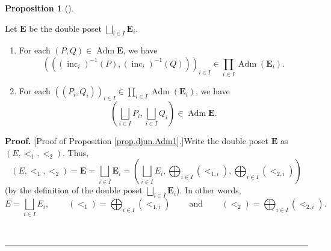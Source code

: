 \documentclass[numbers=enddot,12pt,final,onecolumn,notitlepage,abstracton]{scrartcl}
\theoremstyle{definition}
\newtheorem{prop}[theo]{Proposition}
\newenvironment{proposition}[1][]
{\begin{prop}[#1]\begin{leftbar}}
{\end{leftbar}\end{prop}}
\newenvironment{proof}[1][Proof]{\noindent\textbf{#1.} }{\ \rule{0.5em}{0.5em}}
\let\prodnonlimits\prod
\renewcommand{\prod}{\prodnonlimits\limits}
\newenvironment{verlong}{}{}
\begin{document}
\begin{verlong}
\begin{footnotesize}
\begin{proposition}
Let $\mathbf{E}$ be the double poset $\bigsqcup_{i\in I}\mathbf{E}_{i}$.

\begin{enumerate}
\item[(a)] For each $\left(  P,Q\right)  \in\operatorname*{Adm}\mathbf{E}$, we
have%
\[
\left(  \left(  \left(  \operatorname*{inc}\nolimits_{i}\right)  ^{-1}\left(
P\right)  ,\left(  \operatorname*{inc}\nolimits_{i}\right)  ^{-1}\left(
Q\right)  \right)  \right)  _{i\in I}\in\prod_{i\in I}\operatorname*{Adm}%
\left(  \mathbf{E}_{i}\right)  .
\]


\item[(b)] For each $\left(  \left(  P_{i},Q_{i}\right)  \right)  _{i\in I}%
\in\prod_{i\in I}\operatorname*{Adm}\left(  \mathbf{E}_{i}\right)  $, we have%
\[
\left(  \bigsqcup_{i\in I}P_{i},\bigsqcup_{i\in I}Q_{i}\right)  \in
\operatorname*{Adm}\mathbf{E}.
\]

\end{enumerate}
\end{proposition}

\begin{proof}
[Proof of Proposition \ref{prop.djun.Adm1}.]Write the double poset
$\mathbf{E}$ as $\left(  E,<_{1},<_{2}\right)  $. Thus,%
\[
\left(  E,<_{1},<_{2}\right)  =\mathbf{E}=\bigsqcup_{i\in I}\mathbf{E}%
_{i}=\left(  \bigsqcup_{i\in I}E_{i},\bigoplus_{i\in I}\left(  <_{1,i}\right)
,\bigoplus_{i\in I}\left(  <_{2,i}\right)  \right)
\]
(by the definition of the double poset $\bigsqcup_{i\in I}\mathbf{E}_{i}$). In
other words,%
\[
E=\bigsqcup_{i\in I}E_{i},\ \ \ \ \ \ \ \ \ \ \left(  <_{1}\right)
=\bigoplus_{i\in I}\left(  <_{1,i}\right)  \ \ \ \ \ \ \ \ \ \ \text{and}%
\ \ \ \ \ \ \ \ \ \ \left(  <_{2}\right)  =\bigoplus_{i\in I}\left(
<_{2,i}\right)  .
\]



\end{proof}
\end{footnotesize}
\end{verlong}
\end{document}

